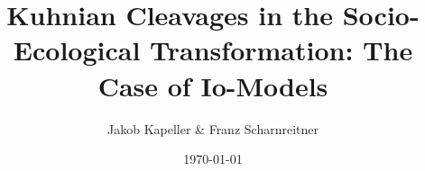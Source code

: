 \documentclass[utf8,aspectratio=169,ngerman,english]{beamer}
\begin{document}


\title{Kuhnian Cleavages in the Socio-Ecological Transformation: The Case of
Io-Models}

\subtitle{}

\author{Jakob Kapeller \& Franz Scharnreitner}



\date{\today}





\end{document}

